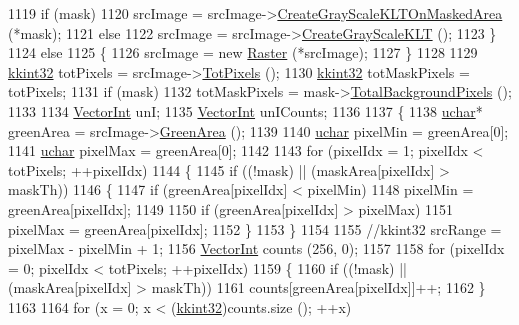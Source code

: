 \begin{DoxyCode}
1119     \textcolor{keywordflow}{if}  (mask)
1120       srcImage = srcImage->\hyperlink{class_k_k_b_1_1_raster_a279dc0c8311fd9b4cfaf351ae515bba2}{CreateGrayScaleKLTOnMaskedArea} (*mask);
1121     \textcolor{keywordflow}{else}
1122       srcImage = srcImage->\hyperlink{class_k_k_b_1_1_raster_afc5e92625a20de51791bd369340d9fa2}{CreateGrayScaleKLT} ();
1123   \}
1124   \textcolor{keywordflow}{else}
1125   \{
1126     srcImage = \textcolor{keyword}{new} \hyperlink{class_k_k_b_1_1_raster}{Raster} (*srcImage);
1127   \}
1128 
1129   \hyperlink{namespace_k_k_b_a8fa4952cc84fda1de4bec1fbdd8d5b1b}{kkint32}  totPixels = srcImage->\hyperlink{class_k_k_b_1_1_raster_a174a392b71afc2295a0ccbfca3d984e9}{TotPixels} ();
1130   \hyperlink{namespace_k_k_b_a8fa4952cc84fda1de4bec1fbdd8d5b1b}{kkint32}  totMaskPixels = totPixels;
1131   \textcolor{keywordflow}{if}  (mask)
1132     totMaskPixels = mask->\hyperlink{class_k_k_b_1_1_raster_ac227e0f97820f74b2518b10852fd2d13}{TotalBackgroundPixels} ();
1133 
1134   \hyperlink{namespace_k_k_b_a791ebe73f89917067a7aab9dbd817e45}{VectorInt}  unI;
1135   \hyperlink{namespace_k_k_b_a791ebe73f89917067a7aab9dbd817e45}{VectorInt}  unICounts;
1136   
1137   \{
1138     \hyperlink{namespace_k_k_b_ace9969169bf514f9ee6185186949cdf7}{uchar}*  greenArea = srcImage->\hyperlink{class_k_k_b_1_1_raster_af6ceacfa7835a295d239d141627dbec7}{GreenArea} ();
1139 
1140     \hyperlink{namespace_k_k_b_ace9969169bf514f9ee6185186949cdf7}{uchar}  pixelMin = greenArea[0];
1141     \hyperlink{namespace_k_k_b_ace9969169bf514f9ee6185186949cdf7}{uchar}  pixelMax = greenArea[0];
1142 
1143     \textcolor{keywordflow}{for}  (pixelIdx = 1;  pixelIdx < totPixels;  ++pixelIdx)
1144     \{
1145       \textcolor{keywordflow}{if}  ((!mask)  ||  (maskArea[pixelIdx] > maskTh))
1146       \{
1147         \textcolor{keywordflow}{if}  (greenArea[pixelIdx] < pixelMin)
1148           pixelMin = greenArea[pixelIdx];
1149 
1150         \textcolor{keywordflow}{if}  (greenArea[pixelIdx] > pixelMax)
1151           pixelMax = greenArea[pixelIdx];
1152       \}
1153     \}
1154 
1155     \textcolor{comment}{//kkint32  srcRange = pixelMax - pixelMin + 1;}
1156     \hyperlink{namespace_k_k_b_a791ebe73f89917067a7aab9dbd817e45}{VectorInt}  counts (256, 0);
1157 
1158     \textcolor{keywordflow}{for}  (pixelIdx = 0;  pixelIdx < totPixels;  ++pixelIdx)
1159     \{
1160       \textcolor{keywordflow}{if}  ((!mask)  ||  (maskArea[pixelIdx] > maskTh))
1161         counts[greenArea[pixelIdx]]++;
1162     \}
1163 
1164     \textcolor{keywordflow}{for}  (x = 0;  x < (\hyperlink{namespace_k_k_b_a8fa4952cc84fda1de4bec1fbdd8d5b1b}{kkint32})counts.size ();  ++x)

\end{DoxyCode}
